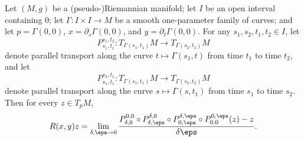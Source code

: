 \begin{theorem}
Let $(M,g)$ be a (pseudo-)Riemannian manifold; let $I$ be an open interval containing $0$; let $\Gamma:I\times I\to M$ be a smooth one-parameter family of curves; and let $p=\Gamma(0,0)$, $x=\partial_s\Gamma(0,0)$, and $y=\partial_t\Gamma(0,0)$. For any $s_1,s_2,t_1,t_2\in I$, let 
\[P_{s_1,t_1}^{s_1,t_2}:T_{\Gamma(s_1,t_1)}M\to T_{\Gamma(s_2,t_2)}M\]
denote parallel transport along the curve $t\mapsto\Gamma(s_1,t)$ from time $t_1$ to time $t_2$, and let 
\[P_{s_1,t_1}^{s_2,t_1}:T_{\Gamma(s_1,t_1)}M\to T_{\Gamma(s_2,t_2)}M\]
denote parallel transport along the curve $s\mapsto\Gamma(s,t_1)$ from time $s_1$ to time $s_2$. Then for every $z\in T_pM$,
\begin{align}\label{Riemann curvature parallel trans-1}
R(x,y)z=\lim_{\delta,\eps\to 0}\frac{P_{\delta,0}^{0,0}\circ P_{\delta,\eps}^{\delta,0}\circ P_{0,\eps}^{\delta,\eps}\circ P_{0,0}^{0,\eps}(z)-z}{\delta\eps}.
\end{align}
\end{theorem}
